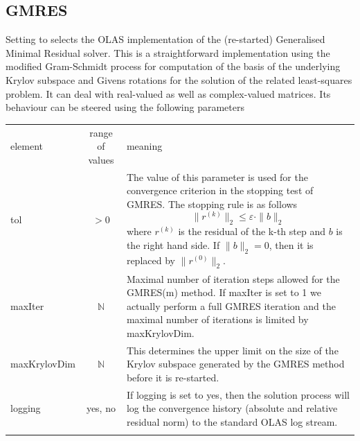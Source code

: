 \subsection{GMRES}
%
%
Setting  to  selects the OLAS implementation of the
(re-started) Generalised Minimal Residual solver. This is a straightforward
implementation using the modified Gram-Schmidt process for computation of the
basis of the underlying Krylov subspace and Givens rotations for the solution
of the related least-squares problem. It can deal with real-valued as well as
complex-valued matrices. Its behaviour can be steered using the following
parameters
%
%
\begin{center}
\begin{tabular}{lcp{}}
\hline\noalign{\smallskip}
element & range of values & meaning \\
\noalign{\smallskip}\hline\noalign{\smallskip}
tol & $> 0$ & The value of this parameter is used for the convergence criterion
              in the stopping test of GMRES. The stopping rule is as follows
	\begin{displaymath}
        \|r^{(k)}\|_2  \leq \varepsilon \cdot \|b\|_2
	\end{displaymath}
        where $r^{(k)}$ is the residual of the k-th step and $b$ is the right
        hand side. If $\|b\|_2=0$, then it is replaced by $\|r^{(0)}\|_2$.\\
\noalign{\smallskip}\hline\noalign{\smallskip}
maxIter & $\mathbb{N}$ & Maximal number of iteration steps allowed for the
                         GMRES(m) method. If maxIter is set to 1 we actually
	                 perform a full GMRES iteration and the maximal
	                 number of iterations is limited by maxKrylovDim.\\
\noalign{\smallskip}\hline\noalign{\smallskip}
maxKrylovDim & $\mathbb{N}$ & This determines the upper limit on the size of
	                      the Krylov subspace generated by the GMRES method
                              before it is re-started.\\
\noalign{\smallskip}\hline\noalign{\smallskip}
logging & yes, no & If logging is set to yes, then the solution process will
	            log the convergence history (absolute and relative residual
                    norm) to the standard OLAS log stream.\\
\noalign{\smallskip}\hline
\end{tabular}
\end{center}
%
%
